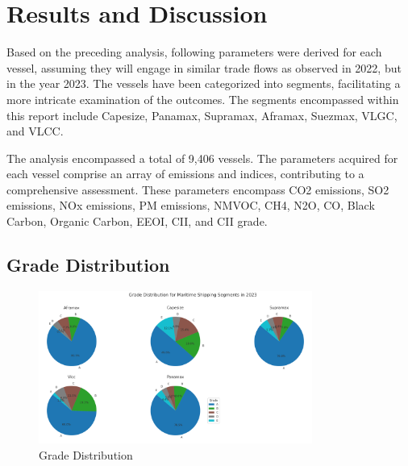 \chapter{Results and Discussion}

Based on the preceding analysis, following parameters were derived for each vessel, assuming they will engage in similar trade flows as observed in 2022, but in the year 2023. 
The vessels have been categorized into segments, facilitating a more intricate examination of the outcomes. The segments encompassed within this report include Capesize, Panamax, Supramax, Aframax, Suezmax, VLGC, and VLCC.

The analysis encompassed a total of 9,406 vessels. 
The parameters acquired for each vessel comprise an array of emissions and indices, contributing to a comprehensive assessment. 
These parameters encompass CO2 emissions, SO2 emissions, NOx emissions, PM emissions, NMVOC, CH4, N2O, CO, Black Carbon, Organic Carbon, EEOI, CII, and CII grade.

\section{Grade Distribution}

\begin{figure}[h]
    \centering
    \includegraphics[width=0.8\textwidth]{images/grade_distribution.png}
    \caption{Grade Distribution}
    \label{grade_distribution}
\end{figure}

